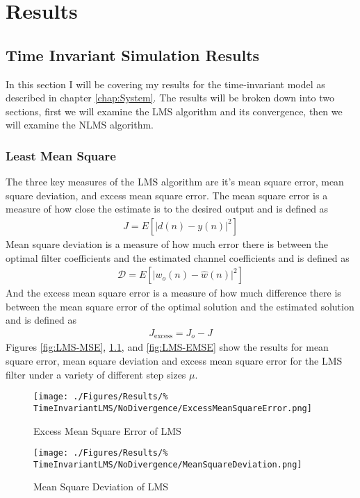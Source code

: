 \chapter{Results}
\label{chap:Results}
\section{Time Invariant Simulation Results}
In this section I will be covering my results for the time-invariant model %
as described in chapter \ref{chap:System}. The results will be broken %
down into two sections, first we will examine the LMS algorithm and %
its convergence, then we will examine the NLMS algorithm.

\subsection{Least Mean Square}
\FloatBarrier
The three key measures of the LMS algorithm are it's mean square error, %
mean square deviation, and excess mean square error. %
The mean square error is a measure of how close the estimate is to the %
desired output and is defined as 
\begin{align}
	J = E\left[ \lvert d(n) - y(n) \rvert^{2} \right]
\end{align}
Mean square deviation is a measure of how much error there is %
between the optimal filter coefficients and the estimated %
channel coefficients and is defined as
\begin{align}
	\mathscr{D} = E\left[ \lvert w_{o}(n) - \hat{w}(n) \rvert^{2} \right]
\end{align}
And the excess mean square error is a measure of how much %
difference there is between the mean square error of the %
optimal solution and the estimated solution and is defined as
\begin{align}
	J_{\text{excess}} = J_{o} - J
\end{align}
Figures \ref{fig:LMS-MSE}, \ref{fig:LMS-MSD}, and \ref{fig:LMS-EMSE} %
show the results for mean square error, mean square deviation and %
excess mean square error for the LMS filter under a variety of %
different step sizes $\mu$.
\begin{figure}[ht]
	\centering
	\begin{minipage}{0.49\textwidth}
		\centering
		\texttt{[image: ./Figures/Results/\%
		TimeInvariantLMS/NoDivergence/ExcessMeanSquareError.png]}
		\caption{Excess Mean Square Error of LMS}
		\label{fig:LMS-EMSE}
	\end{minipage}
	\begin{minipage}{0.49\textwidth}
		\centering
		\texttt{[image: ./Figures/Results/\%
		TimeInvariantLMS/NoDivergence/MeanSquareDeviation.png]}
		\caption{Mean Square Deviation of LMS}
		\label{fig:LMS-MSD}
	\end{minipage}
\end{figure}
